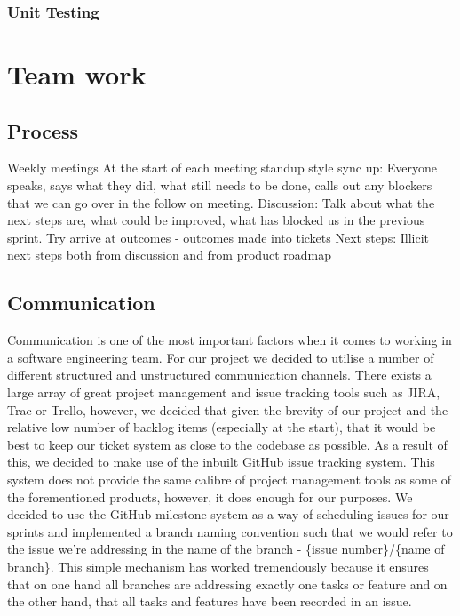 \documentclass[a4paper]{article}
\begin{document}
	\subsubsection{Unit Testing}
	\section{Team work} 
	
	
	\subsection{Process}
	Weekly meetings
	At the start of each meeting standup style sync up:
	Everyone speaks, says what they did, what still needs to be done, calls out any blockers that we can go over in the follow on meeting.
	Discussion: 
	Talk about what the next steps are, what could be improved, what has blocked us in the previous sprint. Try arrive at outcomes - outcomes made into tickets
	Next steps:
	Illicit next steps both from discussion and from product roadmap
	
	
	\subsection{Communication}
	
	Communication is one of the most important factors when it comes to working in a software engineering team. For our project we decided to utilise a number of different structured and unstructured communication channels. There exists a large array of great project management and issue tracking tools such as JIRA, Trac or Trello, however, we decided that given the brevity of our project and the relative low number of backlog items (especially at the start), that it would be best to keep our ticket system as close to the codebase as possible. As a result of this, we decided to make use of the inbuilt GitHub issue tracking system. This system does not provide the same calibre of project management tools as some of the forementioned products, however, it does enough for our purposes. We decided to use the GitHub milestone system as a way of scheduling issues for our sprints and implemented a branch naming convention such that we would refer to the issue we're addressing in the name of the branch - \{issue number\}/\{name of branch\}. This simple mechanism has worked tremendously because it ensures that on one hand all branches are addressing exactly one tasks or feature and on the other hand, that all tasks and features have been recorded in an issue. 
	
\end{document}
